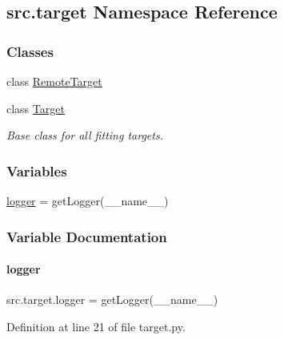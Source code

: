 \hypertarget{namespacesrc_1_1target}{}\subsection{src.\+target Namespace Reference}
\label{namespacesrc_1_1target}
\subsubsection*{Classes}
\begin{DoxyCompactItemize}
\item 
class \hyperlink{classsrc_1_1target_1_1RemoteTarget}{Remote\+Target}
\item 
class \hyperlink{classsrc_1_1target_1_1Target}{Target}
\begin{DoxyCompactList}\small\item\em Base class for all fitting targets. \end{DoxyCompactList}\end{DoxyCompactItemize}
\subsubsection*{Variables}
\begin{DoxyCompactItemize}
\item 
\hyperlink{namespacesrc_1_1target_aca144c9b09ebc2d53039267a0bf9fe6b}{logger} = get\+Logger(\+\_\+\+\_\+name\+\_\+\+\_\+)
\end{DoxyCompactItemize}


\subsubsection{Variable Documentation}
\mbox{\label{namespacesrc_1_1target_aca144c9b09ebc2d53039267a0bf9fe6b}} 
\paragraph{\texorpdfstring{logger}{logger}}
{\footnotesize\ttfamily src.\+target.\+logger = get\+Logger(\+\_\+\+\_\+name\+\_\+\+\_\+)}



Definition at line 21 of file target.\+py.

